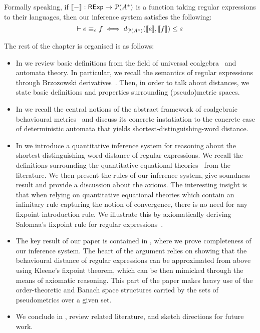 Formally speaking, if $\left\llbracket{-}\right\rrbracket: \mathsf{RExp} \to \mathcal{P} ({A}^*)$ is a function taking regular expressions to their languages, then our inference system satisfies the following:
$$
	\vdash e \equiv_\varepsilon f \iff d_{\mathcal{P}({A}^{\ast})}(\llbracket e \rrbracket, \llbracket f \rrbracket) \leq \varepsilon
$$ 

The rest of the chapter is organised is as follows:
\begin{itemize}
	\item In  we review basic definitions from the field of universal coalgebra~\cite{Rutten:2000:Universal,Gumm:2000:Elements} and automata theory. In particular, we recall the semantics of regular expressions through Brzozowski derivatives~\cite{Brzozowski:1964:Expressions}. Then, in order to talk about distances, we state basic definitions and properties surrounding (pseudo)metric spaces.
	\item In  we recall the central notions of the abstract framework of coalgebraic behavioural metrics~\cite{Baldan:2018:Coalgebraic} and discuss its concrete instatiation to the concrete case of deterministic automata that yields shortest-distinguishing-word distance.
	\item In  we introduce a quantitative inference system for reasoning about the shortest-distinguishing-word distance of regular expressions. We recall the definitions surrounding the quantitative equational theories~\cite{Mardare:2016:Quantitative} from the literature. We then present the rules of our inference system, give soundness result and provide a discussion about the axioms. The interesting insight is that when relying on quantitative equational theories which contain an infinitary rule capturing the notion of convergence, there is no need for any fixpoint introduction rule. We illustrate this by axiomatically deriving Salomaa's fixpoint rule for regular expressions~\cite{Salomaa:1966:Two}.
	\item The key result of our paper is contained in , where we prove completeness of our inference system. The heart of the argument relies on showing that the behavioural distance of regular expressions can be approximated from above using Kleene's fixpoint theorem, which can be then mimicked through the means of axiomatic reasoning. This part of the paper makes heavy use of the order-theoretic and Banach space structures carried by the sets of pseudometrics over a given set.
	\item We conclude in , review related literature, and sketch directions for future work.
\end{itemize}
